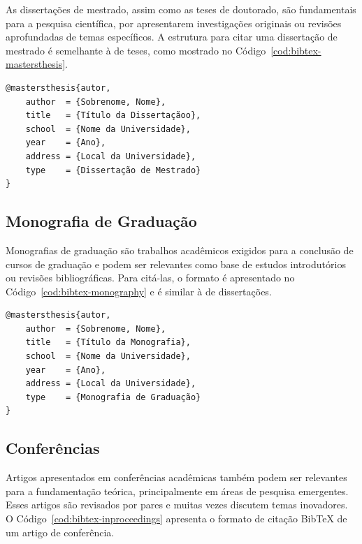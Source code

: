 As dissertações de mestrado, assim como as teses de doutorado, são fundamentais para a pesquisa científica, por apresentarem investigações originais ou revisões aprofundadas de temas específicos. A estrutura para citar uma dissertação de mestrado é semelhante à de teses, como mostrado no Código~\ref{cod:bibtex-mastersthesis}.

\begin{codigo}[htb]
\begin{lstlisting}
@mastersthesis{autor,
    author  = {Sobrenome, Nome},
    title   = {Título da Dissertaçãoo},
    school  = {Nome da Universidade},
    year    = {Ano},
    address = {Local da Universidade},
    type    = {Dissertação de Mestrado}
}
\end{lstlisting}
\fonteautor
\end{codigo}

\subsection{Monografia de Graduação}

Monografias de graduação são trabalhos acadêmicos exigidos para a conclusão de cursos de graduação e podem ser relevantes como base de estudos introdutórios ou revisões bibliográficas. Para citá-las, o formato é apresentado no Código~\ref{cod:bibtex-monography} e é similar à de dissertações.

\begin{codigo}[htb]
\begin{lstlisting}
@mastersthesis{autor,
    author  = {Sobrenome, Nome},
    title   = {Título da Monografia},
    school  = {Nome da Universidade},
    year    = {Ano},
    address = {Local da Universidade},
    type    = {Monografia de Graduação}
}
\end{lstlisting}
\fonteautor
\end{codigo}

\subsection{Conferências}

Artigos apresentados em conferências acadêmicas também podem ser relevantes para a fundamentação teórica, principalmente em áreas de pesquisa emergentes. Esses artigos são revisados por pares e muitas vezes discutem temas inovadores. O Código~\ref{cod:bibtex-inproceedings} apresenta o formato de citação BibTeX de um artigo de conferência.

